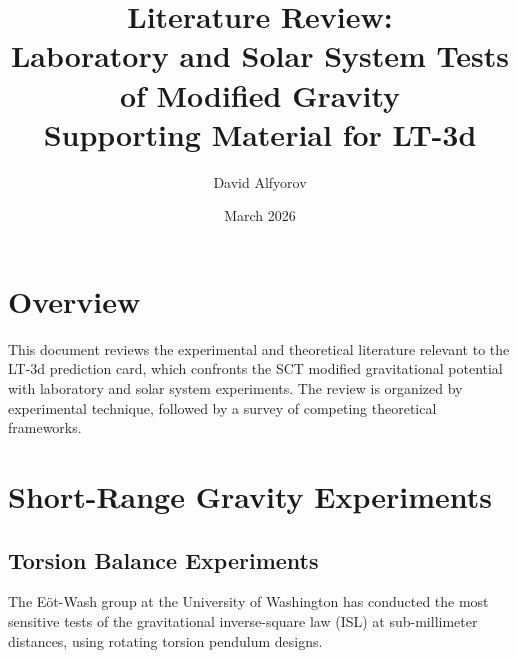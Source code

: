 \documentclass[11pt,a4paper]{article}
\title{%
  \textbf{Literature Review:}\\[4pt]
  \Large Laboratory and Solar System Tests of Modified Gravity\\[4pt]
  \large Supporting Material for LT-3d
}
\author{David Alfyorov}
\date{March 2026}
\begin{document}
\maketitle

\begin{center}
\end{center}

\tableofcontents

\section{Overview}

This document reviews the experimental and theoretical literature relevant to the
LT-3d prediction card, which confronts the SCT modified gravitational potential
with laboratory and solar system experiments. The review is organized by
experimental technique, followed by a survey of competing theoretical frameworks.

\section{Short-Range Gravity Experiments}
\label{sec:short-range}

\subsection{Torsion Balance Experiments}

The E\"ot-Wash group at the University of Washington has conducted the most
sensitive tests of the gravitational inverse-square law (ISL) at sub-millimeter
distances, using rotating torsion pendulum designs.
\end{document}

